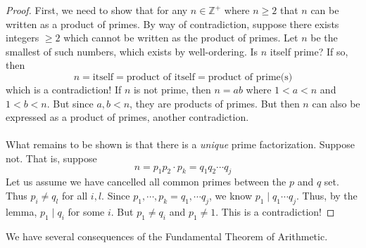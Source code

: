 \documentclass[class=article, crop=false]{standalone}
\def\integers{{\mathbb Z}}
\begin{document}
\begin{proof}
	First, we need to show that for any $n\in\integers^+$ where $n\geq 2$ that $n$ can be written as a product of
	primes. By way of contradiction, suppose there exists integers $\geq 2$ which cannot be written as the product
	of primes. Let $n$ be the smallest of such numbers, which exists by well-ordering. Is $n$ itself prime? If so, then
	$$n=\text{itself}=\text{product of itself}=\text{product of prime(s)}$$
	which is a contradiction! If $n$ is not prime, then $n=ab$ where $1<a<n$ and $1<b<n$. But since $a,b<n$, they are
	products of primes. But then $n$ can also be expressed as a product of primes, another contradiction.\\\\
	What remains to be shown is that there is a \emph{unique} prime factorization. Suppose not. That is, suppose
	$$n=p_1 p_2\cdot p_k = q_1 q_2 \cdots q_j$$
	Let us assume we have cancelled all common primes between the $p$ and $q$ set. Thus $p_i\neq q_l$ for all 
	$i,l$. Since $p_1,\cdots,p_k=q_1,\cdots q_j$, we know $p_1\mid q_1\cdots q_j$. Thus, by the lemma, $p_1\mid q_i$
	for some $i$. But $p_1\neq q_i$ and $p_1\neq 1$. This is a contradiction!
\end{proof}
\noindent We have several consequences of the Fundamental Theorem of Arithmetic.
\end{document}
